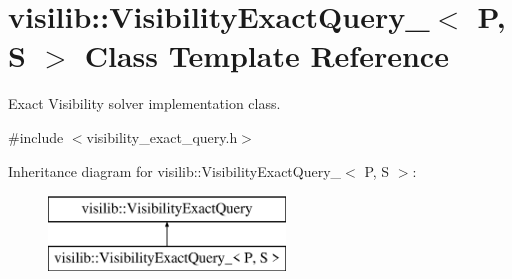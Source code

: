 \hypertarget{classvisilib_1_1_visibility_exact_query__}{}\section{visilib\+::Visibility\+Exact\+Query\+\_\+$<$ P, S $>$ Class Template Reference}
\label{classvisilib_1_1_visibility_exact_query__}


Exact Visibility solver implementation class.  




{\ttfamily \#include $<$visibility\+\_\+exact\+\_\+query.\+h$>$}

Inheritance diagram for visilib\+::Visibility\+Exact\+Query\+\_\+$<$ P, S $>$\+:\begin{figure}[H]
\begin{center}
\leavevmode
\includegraphics[height=2.000000cm]{classvisilib_1_1_visibility_exact_query__}
\end{center}
\end{figure}
